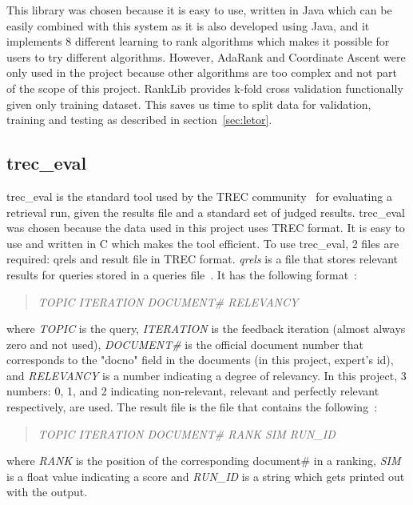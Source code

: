 This library was chosen because it is easy to use, written in Java which can be easily combined with this system as it is also developed using Java, and
it implements 8 different learning to rank algorithms which makes it possible for users to try different algorithms.
However, AdaRank and Coordinate Ascent were only used in the project because other algorithms are too complex and not part of the scope of this project.
RankLib provides k-fold cross validation functionally given only training dataset. This saves us time to split data for validation, training and 
testing as described in section~\ref{sec:letor}.

\subsection{trec\_eval}\label{sec:treceval}
trec\_eval is the standard tool used by the TREC community~\cite{trec} for evaluating a retrieval run, given the results file and a
standard set of judged results. trec\_eval was chosen because the data used in this project uses TREC format. 
It is easy to use and written in C which makes the tool efficient. To use trec\_eval, 2 files are required: qrels and result file in TREC format.
\textit{qrels} is a file that stores relevant results for queries stored in a queries file~\cite{qrels}. It has the following format~\cite{qrelsformat}:
\begin{quotation}
 \textit{TOPIC ITERATION DOCUMENT\# RELEVANCY}
\end{quotation}
where \textit{TOPIC} is the query, \textit{ITERATION} is the feedback iteration (almost always zero and not used),
\textit{DOCUMENT\#} is the official document number that corresponds to the "docno" field in the documents (in this project, expert's id), and
\textit{RELEVANCY} is a number indicating a degree of relevancy. In this project, 3 numbers: 0, 1, and 2 indicating non-relevant, relevant and perfectly
relevant respectively, are used. The result file is the file that contains the following~\cite{resultfileformat}:
\begin{quotation}
 \textit{TOPIC ITERATION DOCUMENT\# RANK SIM RUN\_ID}
\end{quotation}
where \textit{RANK} is the position of the corresponding document\# in a ranking, \textit{SIM} is a float value indicating a score and \textit{RUN\_ID}
is a string which gets printed out with the output.



